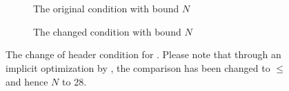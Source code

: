 \begin{figure}[H]
    \begin{subfigure}[t]{0.5\textwidth}
        \centering
        \begin{adjustbox}{max width=0.49\textwidth}
            \centering
            
        \end{adjustbox}
        \caption{The original condition with bound $N$}
    \end{subfigure}
    \begin{subfigure}[t]{0.5\textwidth}
        \centering
        \begin{adjustbox}{max width=0.49\textwidth}
            \centering
            
        \end{adjustbox}
        \caption{The changed condition with bound $\hat{N}$}
    \end{subfigure}
    \caption{
    The change of header condition for .
    Please note that through an implicit optimization by \libFIRM{}, the comparison has been changed to $\leq$ and hence $N$ to 28.
    }
    \label{fig:impl:fixup:header-cond:firm}
\end{figure}